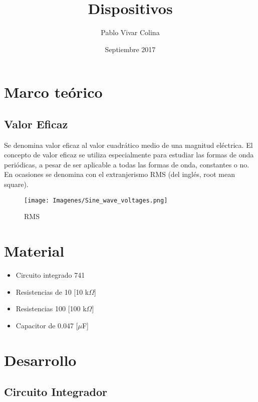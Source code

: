 \documentclass{article}
\title{Dispositivos}
\author{Pablo Vivar Colina}
\date{Septiembre 2017}
\begin{document}


\section{Marco teórico}

\subsection{Valor Eficaz}

Se denomina valor eficaz al valor cuadrático medio de una magnitud eléctrica. El concepto de valor eficaz se utiliza especialmente para estudiar las formas de onda periódicas, a pesar de ser aplicable a todas las formas de onda, constantes o no. En ocasiones se denomina con el extranjerismo RMS (del inglés, root mean square).\citep{valorEficazWiki}\\

 \begin{figure}[h!]
     \centering
     \texttt{[image: Imagenes/Sine\_wave\_voltages.png]}
     \caption{RMS}
     \label{fig:my_label}
 \end{figure}
 
 
 \section{Material}

\begin{itemize}
    \item Circuito integrado 741
    \item Resistencias de 10 [10 k$\Omega$]
    \item Resistencias 100 [100 k$\Omega$]
    \item Capacitor de 0.047 [$\mu$F]
\end{itemize}

\section{Desarrollo}

\subsection{Circuito Integrador}
\end{document}
